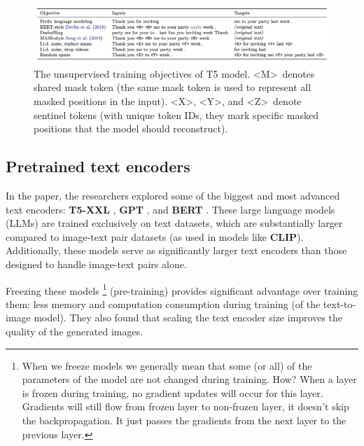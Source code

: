 \begin{figure}[h]
    \centering
    \includegraphics[width=1\textwidth]{images/imagen/t5_objectives.png}
    \caption{The unsupervised training objectives of T5 model. \textless M\textgreater\ denotes shared mask token (the same mask token is used to represent all masked positions in the input). \textless X\textgreater, \textless Y\textgreater, and \textless Z\textgreater\ denote sentinel tokens (with unique token IDs, they mark specific masked positions that the model should reconstruct).}
\end{figure}















\subsection{Pretrained text encoders}

In the paper, the researchers explored some of the biggest and most advanced text encoders: \textbf{T5-XXL} \cite{t5_model}, \textbf{GPT} \cite{gpt} \cite{mingpt} \cite{gpt_another}, and \textbf{BERT} \cite{bert}. These large language models (LLMs) are trained exclusively on text datasets, which are substantially larger compared to image-text pair datasets (as used in models like \textbf{CLIP}). Additionally, these models serve as significantly larger text encoders than those designed to handle image-text pairs alone.

Freezing these models \footnote{When we freeze models we generally mean that some (or all) of the parameters of the model are not changed during training. How? When a layer is frozen during training, no gradient updates will occur for this layer. Gradients will still flow from frozen layer to non-frozen layer, it doesn't skip the backpropagation. It just passes the gradients from the next layer to the previous layer.} (pre-training) provides significant advantage over training them: less memory and computation consumption during training (of the text-to-image model). They also found that scaling the text encoder size improves the quality of the generated images.














